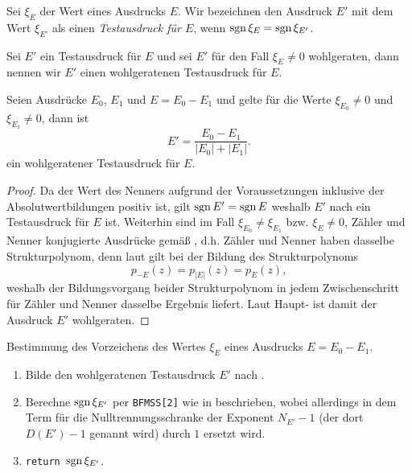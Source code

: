 \begin{definition}[Testausdruck]\label{de:Testausdruck}
Sei $\xi_E$ der Wert eines Ausdrucks $E$.
Wir bezeichnen den Ausdruck $E'$ mit dem Wert $\xi_{E'}$
als einen {\em Testausdruck für $E$},
wenn $\operatorname{sgn}\xi_E = \operatorname{sgn}\xi_{E'}$.
\end{definition}


\begin{definition}
Sei $E'$ ein Testausdruck für $E$
und sei $E'$ für den Fall $\xi_E\ne 0$ wohlgeraten,
dann nennen wir $E'$ einen wohlgeratenen Testausdruck für $E$.
\end{definition}


\begin{theorem}\label{th:Ein wohlgeratener Testausdruck}
Seien Ausdrücke $E_0$, $E_1$ und $E=E_0-E_1$
und gelte für die Werte $\xi_{E_0}\ne 0$ und $\xi_{E_1}\ne 0$,
dann ist 
\begin{equation*}
  E' = \frac{E_0-E_1}{|E_0|+|E_1|}.
\end{equation*}
ein wohlgeratener Testausdruck für $E$.
\begin{proof}
Da der Wert des Nenners
aufgrund der Voraussetzungen inklusive der Absolutwertbildungen
positiv ist, gilt $\operatorname{sgn} E'=\operatorname{sgn} E$ 
weshalb $E'$ nach 
ein Testausdruck für $E$ ist.
Weiterhin sind im Fall $\xi_{E_0}\ne\xi_{E_1}$
bzw. $\xi_E\ne 0$, Zähler und Nenner 
konjugierte Ausdrücke gemäß ,
d.h. Zähler und Nenner haben dasselbe Strukturpolynom,
denn laut 
gilt bei der Bildung des Strukturpolynoms 
\begin{equation*}
p_{-E}(z) = p_{|E|}(z) = p_E(z),
\end{equation*}
weshalb der Bildungsvorgang beider Strukturpolynom 
in jedem Zwischenschritt für Zähler und Nenner 
dasselbe Ergebnis liefert.
Laut Haupt-
ist damit der Ausdruck $E'$ wohlgeraten.
\end{proof}
\end{theorem}

\pagebreak
\begin{algorithm}\label{al:Vorzeichentest}
Bestimmung des Vorzeichens des Wertes $\xi_E$ 
eines Ausdrucks $E=E_0-E_1$.
\begin{enumerate}
\item Bilde den wohlgeratenen Testausdruck $E'$
      nach .
\item Berechne $\operatorname{sgn}\xi_{E'}$
      per {\tt BFMSS[2]} wie in \cite{BFMSS, PIYAP} beschrieben,
	  wobei allerdings in dem Term für die Nulltrennungsschranke
	  der Exponent $N_{E'}-1$ (der dort $D(E')-1$ genannt wird)
	  durch $1$ ersetzt wird.
\item {\tt return $\operatorname{sgn}\xi_{E'}$}.
\end{enumerate}
\end{algorithm}



